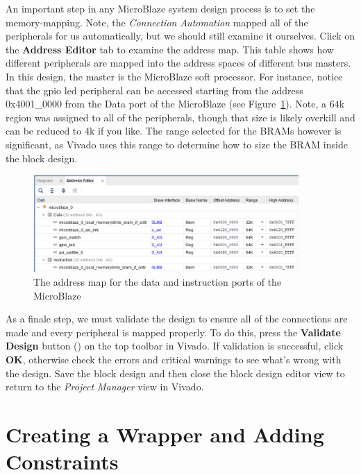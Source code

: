 \documentclass[11pt]{article}
\begin{document}
An important step in any MicroBlaze system design process is to set the memory-mapping. Note, the \textit{Connection Automation} mapped all of the peripherals for us automatically, but we should still examine it ourselves. Click on the \textbf{Address Editor} tab to examine the address map. This table shows how different peripherals are mapped into the address spaces of different bus masters. In this design, the master is the MicroBlaze soft processor. For instance, notice that the gpio led peripheral can be accessed starting from the address 0x4001\_0000 from the Data port of the MicroBlaze (see Figure~\ref{fig:address_map}). Note, a 64k region was assigned to all of the peripherals, though that size is likely overkill and can be reduced to 4k if you like. The range selected for the BRAMs however is significant, as Vivado uses this range to determine how to size the BRAM inside the block design.

\begin{figure}[h]
    \centering
    \includegraphics[width=0.9\textwidth]{images/address_map.png}
    \caption{The address map for the data and instruction ports of the MicroBlaze}
    \label{fig:address_map}
\end{figure}

As a finale step, we must validate the design to ensure all of the connections are made and every peripheral is mapped properly. To do this, press the \textbf{Validate Design} button
()
on the top toolbar in Vivado. If validation is successful, click \textbf{OK}, otherwise check the errors and critical warnings to see what's wrong with the design. Save the block design and then close the block design editor view to return to the \textit{Project Manager} view in Vivado.




\section{Creating a Wrapper and Adding Constraints}
\label{sec:wrap_cons}
\end{document}
